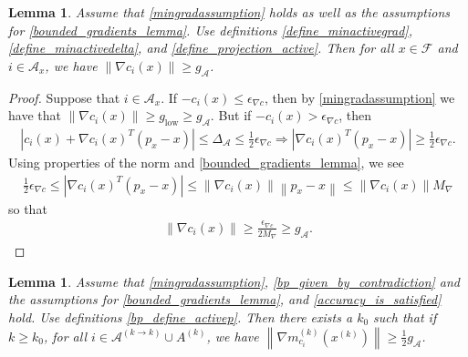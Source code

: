 \documentclass{article}
\newtheorem{lemma}[theorem]{Lemma}
\theoremstyle{case}
\numberwithin{theorem}{subsection}
\newcommand{\feasible}{{\mathcal F}}
\newcommand{\gmcik}{{\nabla m_{c_i}^{(k)}\left(\xk\right)}}
\newcommand{\maxgrad}{{M_{\nabla}}}
\newcommand{\minactivegraddelta}{{\Delta_{\mathcal A}}}
\newcommand{\minactivegrad}{{ g_{\mathcal A} }}
\newcommand{\mingradepsilon}{{\epsilon_{\nabla c}}}
\newcommand{\mingrad}{{ g_{\textrm{low}} }}
\newcommand{\xk}{{x^{(k)}}}
\begin{document}
\begin{lemma}
\label{min_active_gradient_lemma}
Assume that \cref{mingradassumption} holds as well as the assumptions for \cref{bounded_gradients_lemma}.
Use definitions \cref{define_minactivegrad}, \cref{define_minactivedelta}, and \cref{define_projection_active}.
Then for all $x \in \feasible$ and $i \in \mathcal A_x$, we have $\left\|\nabla c_i(x)\right\| \ge \minactivegrad$.
\end{lemma}

\begin{proof}
Suppose that $i \in \mathcal A_x$.
If $-c_i(x) \le \mingradepsilon$, then by \cref{mingradassumption} we have that $\|\nabla c_i(x)\| \ge \mingrad \ge \minactivegrad$.
But if $-c_i(x) > \mingradepsilon$, then
\begin{align*}
\left|c_i(x) + \nabla c_i(x)^T(p_x - x)\right| \le \minactivegraddelta \le \frac 1 2 \mingradepsilon
\Longrightarrow \left|\nabla c_i(x)^T(p_x - x)\right| \ge \frac 1 2 \mingradepsilon.
\end{align*}
Using properties of the norm and \cref{bounded_gradients_lemma}, we see
\begin{align*}
\frac 1 2 \mingradepsilon \le \left|\nabla c_i(x)^T(p_x - x)\right| \le \left\|\nabla c_i(x)\right\|\left\|p_x - x\right\| \le \left\|\nabla c_i(x)\right\| \maxgrad
\end{align*}
so that 
\begin{align*}
\left\|\nabla c_i(x)\right\| \ge \frac {\mingradepsilon} {2 \maxgrad} \ge \minactivegrad.
\end{align*}
\end{proof}




\begin{lemma}
\label{min_active_model_gradient_lemma}
Assume that
\cref{mingradassumption}, \cref{bp_given_by_contradiction}
and the assumptions for
\cref{bounded_gradients_lemma}, and \cref{accuracy_is_satisfied} hold.
Use definitions \cref{bp_define_activep}.
Then there exists a $k_0$ such that if $k \ge k_0$,
for all $i \in \mathcal A^{(k\to k)} \cup A^{(k)}$, we have $\left\|\gmcik\right\| \ge \frac 1 2 \minactivegrad$.
\end{lemma}
\end{document}
